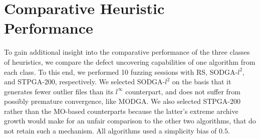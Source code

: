\begin{center}
\end{center}


\section{\label{sec:resrq2}Comparative Heuristic Performance}

To gain additional insight into the comparative performance of the
three classes of heuristics, we compare the
defect uncovering capabilities of one algorithm from each class.
To this end, we performed 10 fuzzing sessions with \gls{RS}, \gls{SODGA}-$l^2$,
and \gls{STPGA}-200, respectively.
We selected \gls{SODGA}-$l^2$ on the basis that it generates
fewer outlier files than its $l^\infty$ counterpart, and does not suffer
from possibly premature convergence, like \gls{MODGA}.
We also selected \gls{STPGA}-200 rather than the \gls{MO}-based counterparts
because the latter's extreme archive growth would make for an unfair
comparison to the other two algorithms, that do not retain such a mechanism.
All algorithms used a simplicity bias of $0.5$.

